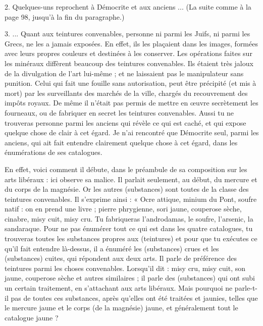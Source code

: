 \documentclass[a4paper, 11pt, oneside, polutonikogreek, french]{article}
\begin{document}
2. Quelques-uns reprochent à Démocrite et aux anciens ... (La suite comme à la page 98, jusqu'à la fin du paragraphe.)

3. ... Quant aux teintures convenables, personne ni parmi les Juifs, ni parmi les Grecs, ne les a jamais exposées. En effet, ils les plaçaient dans les images, formées avec leurs propres couleurs et destinées à les conserver. Les opérations faites sur les minéraux diffèrent beaucoup des teintures convenables. Ils étaient très jaloux de la divulgation de l'art lui-même ; et ne laissaient pas le manipulateur sans punition. Celui qui fait une fouille sans autorisation, peut être précipité (et mis à mort) par les surveillants des marchés de la ville, chargés du recouvrement des impôts royaux. De même il n'était pas permis de mettre en œuvre secrètement les fourneaux, ou de fabriquer en secret les teintures convenables. Aussi tu ne trouveras personne parmi les anciens qui révèle ce qui est caché, et qui expose quelque chose de clair à cet égard. Je n'ai rencontré que Démocrite seul, parmi les anciens, qui ait fait entendre clairement quelque chose à cet égard, dans les énumérations de ses catalogues.

En effet, voici comment il débute, dans le préambule de sa composition sur les arts libéraux : ici observe sa malice. Il parlait seulement, au début, du mercure et du corps de la magnésie. Or les autres (substances) sont toutes de la classe des teintures convenables. Il s'exprime ainsi : « Ocre attique, minium du Pont, soufre natif : on en prend une livre ; pierre phrygienne, sori jaune, couperose sèche, cinabre, misy cuit, misy cru. Tu fabriqueras l'androdamas, le soufre, l'arsenic, la sandaraque. Pour ne pas énumérer tout ce qui est dans les quatre catalogues, tu trouveras toutes les substances propres aux (teintures) et pour que tu exécutes ce qu'il fait entendre là-dessus, il a énuméré les (substances) crues et les (substances) cuites, qui répondent aux deux arts. Il parle de préférence des teintures parmi les choses convenables. Lorsqu'il dit : misy cru, misy cuit, son jaune, couperose sèche et autres similaires ; il parle des (substances) qui ont subi un certain traitement, en s'attachant aux arts libéraux. Mais pourquoi ne parle-t-il pas de toutes ces substances, après qu'elles ont été traitées et jaunies, telles que le mercure jaune et le corps (de la magnésie) jaune, et généralement tout le catalogue jaune ?
\end{document}
